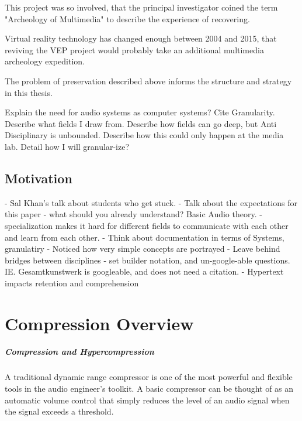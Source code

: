 This project was so involved, that the principal investigator coined
the term "Archeology of Multimedia" to describe the experience of
recovering.

Virtual reality technology has changed enough between 2004 and 2015,
that reviving the VEP project would probably take an additional
multimedia archeology expedition.

The problem of preservation described above informs the structure and
strategy in this thesis. 

Explain the need for audio systems as computer systems? Cite
Granularity. Describe what fields I draw from. Describe how fields can
go deep, but Anti Disciplinary is unbounded. Describe how this could
only happen at the media lab. Detail how I will granular-ize?

\section{Motivation}
\label{sec:motivation}

  - Sal Khan's talk about students who get stuck. 
  - Talk about the expectations for this paper - what should you
    already understand? Basic Audio theory. 
  - specialization makes it hard for different fields to communicate
  with each other and learn from each other.
  - Think about documentation in terms of Systems, granulatiry
  - Noticed how very simple concepts are portrayed 
  - Leave behind bridges between disciplines
  - set builder notation, and un-google-able
  questions. IE. Gesamtkunstwerk is googleable, and does not need a
  citation.
  - Hypertext impacts retention and comprehension



\chapter{Compression Overview}
\label{cha:compression-overview}

\paragraph{Compression and Hypercompression} A traditional
dynamic range compressor is one of the most powerful and flexible
tools in the audio engineer's toolkit.  A basic compressor can be
thought of as an automatic volume control that simply reduces the
level of an audio signal when the signal exceeds a threshold. 

